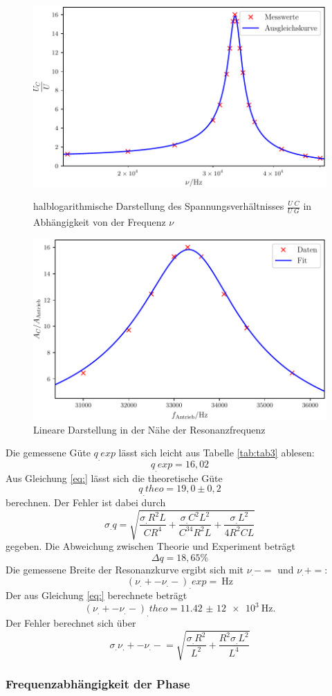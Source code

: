 \begin{figure}
\centering
\includegraphics[scale=0.6]{content/images/Graphc1.pdf}
\caption{halblogarithmische Darstellung des Spannungsverhältnisses $\frac{U_.C}{U_.G}$ in Abhängigkeit von der Frequenz $\nu$}\label{fig:abb2}
\includegraphics[scale=0.6]{content/images/Graphc2.pdf}
\caption{Lineare Darstellung in der Nähe der Resonanzfrequenz}
\label{fig:abb3}
\end{figure}
\newpage
\noindent
Die gemessene Güte $q_.{exp}$ lässt sich leicht aus Tabelle \ref{tab:tab3} ablesen:
\[
q_.{exp}=16,02
\]
Aus Gleichung \eqref{eq:} lässt sich die theoretische Güte 
\[
q_.{theo}=19,0\pm 0,2
\] berechnen.
Der Fehler ist dabei durch 
\[
\sigma_.q=\sqrt{\frac{\sigma_.R^2L}{CR^4}+\frac{\sigma_.C^2L^2}{C^34R^2L}+\frac{\sigma_.L^2}{4R^2CL}}
\]
gegeben.
Die Abweichung zwischen Theorie und Experiment beträgt
\[
\Delta q = 18,65\%
\]
Die gemessene Breite der Resonanzkurve ergibt sich mit $\nu_.-=$ und $\nu_.+=$:
\[
(\nu_.+-\nu_.-)_.{exp}=\SI{}{\hertz}
\]
Der aus Gleichung \eqref{eq:} berechnete beträgt
\[
(\nu_.+-\nu_.-)_.{theo}=\SI{11,42(12)e3}{\hertz}\text{.}
\]
Der Fehler berechnet sich über
\[
\sigma_.{\nu_.+-\nu_.-}=\sqrt{\frac{\sigma_.R^2}{L^2}+\frac{R^2\sigma_.L^2}{L^4}}
\]
\subsubsection{Frequenzabhängigkeit der Phase}
